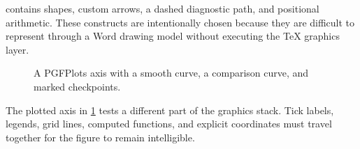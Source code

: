 \documentclass[11pt]{article}
\begin{document}
 contains shapes, custom arrows, a dashed diagnostic path, and positional arithmetic. These constructs are intentionally chosen because they are difficult to represent through a Word drawing model without executing the TeX graphics layer.

\begin{figure}[tbp]
\centering
{}
\caption{A PGFPlots axis with a smooth curve, a comparison curve, and marked checkpoints.}
\label{fig:pgfplots-curve}
\end{figure}

The plotted axis in \cref{fig:pgfplots-curve} tests a different part of the graphics stack. Tick labels, legends, grid lines, computed functions, and explicit coordinates must travel together for the figure to remain intelligible.
\end{document}
